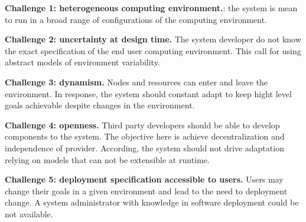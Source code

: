 \label{sec:challenges}

\textbf{ Challenge 1: heterogeneous computing environment.}: the system is mean to run in a broad range of configurations of the computing environment.

\textbf{ Challenge 2: uncertainty at design time.} The system developer do not know the exact specification of the end user computing environment. This call for using abstract models of environment variability.

\textbf{ Challenge 3: dynamism.} Nodes and resources can enter and leave the environment. In response, the system should constant adapt to keep hight level goals achievable despite changes in the environment.

\textbf{ Challenge 4: openness.} Third party developers should be able to develop components to the system. The objective here is achieve decentralization and independence of provider. According, the system should not drive adaptation relying on models that can not be extensible at runtime.

\textbf{ Challenge 5: deployment specification accessible to users.} Users may change their goals in a given environment and lead to the need to deployment change. A system administrator with knowledge in software deployment could be not available.
